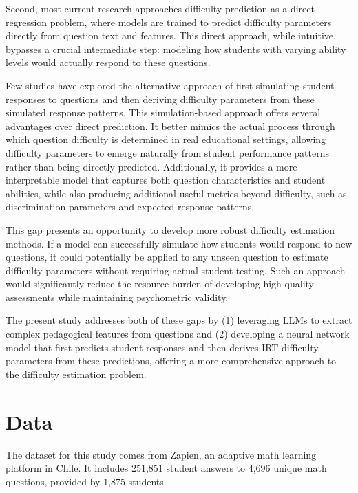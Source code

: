 \documentclass[
    a4paper, %
    10pt, %
    twoside, %
]{LTJournalArticle}
\begin{document}
Second, most current research approaches difficulty prediction as a direct regression problem, where models are trained to predict difficulty parameters directly from question text and features. This direct approach, while intuitive, bypasses a crucial intermediate step: modeling how students with varying ability levels would actually respond to these questions.

Few studies have explored the alternative approach of first simulating student responses to questions and then deriving difficulty parameters from these simulated response patterns. This simulation-based approach offers several advantages over direct prediction. It better mimics the actual process through which question difficulty is determined in real educational settings, allowing difficulty parameters to emerge naturally from student performance patterns rather than being directly predicted. Additionally, it provides a more interpretable model that captures both question characteristics and student abilities, while also producing additional useful metrics beyond difficulty, such as discrimination parameters and expected response patterns.

This gap presents an opportunity to develop more robust difficulty estimation methods. If a model can successfully simulate how students would respond to new questions, it could potentially be applied to any unseen question to estimate difficulty parameters without requiring actual student testing. Such an approach would significantly reduce the resource burden of developing high-quality assessments while maintaining psychometric validity.

The present study addresses both of these gaps by (1) leveraging LLMs to extract complex pedagogical features from questions and (2) developing a neural network model that first predicts student responses and then derives IRT difficulty parameters from these predictions, offering a more comprehensive approach to the difficulty estimation problem.

\section{Data}

The dataset for this study comes from Zapien, an adaptive math learning platform in Chile. It includes 251,851 student answers to 4,696 unique math questions, provided by 1,875 students.
\end{document}
